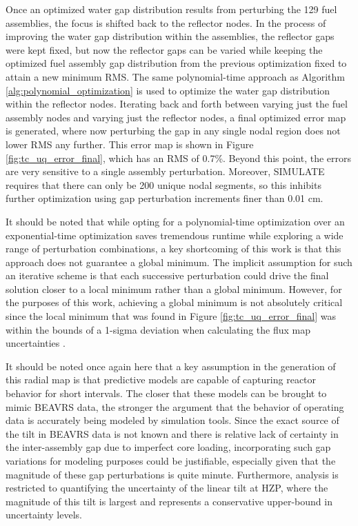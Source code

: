 \documentclass{article}
\begin{document}
Once an optimized water gap distribution results from perturbing the 129 fuel assemblies, the focus is shifted back to the reflector nodes. In the process of improving the water gap distribution within the assemblies, the reflector gaps were kept fixed, but now the reflector gaps can be varied while keeping the optimized fuel assembly gap distribution from the previous optimization fixed to attain a new minimum RMS. The same polynomial-time approach as Algorithm \ref{alg:polynomial_optimization} is used to optimize the water gap distribution within the reflector nodes. Iterating back and forth between varying just the fuel assembly nodes and varying just the reflector nodes, a final optimized error map is generated, where now perturbing the gap in any single nodal region does not lower RMS any further. This error map is shown in Figure \ref{fig:tc_uq_error_final}, which has an RMS of 0.7\%. Beyond this point, the errors are very sensitive to a single assembly perturbation. Moreover, SIMULATE requires that there can only be 200 unique nodal segments, so this inhibits further optimization using gap perturbation increments finer than 0.01 cm.



It should be noted that while opting for a polynomial-time optimization over an exponential-time optimization saves tremendous runtime while exploring a wide range of perturbation combinations, a key shortcoming of this work is that this approach does not guarantee a global minimum. The implicit assumption for such an iterative scheme is that each successive perturbation could drive the final solution closer to a local minimum rather than a global minimum. However, for the purposes of this work, achieving a global minimum is not absolutely critical since the local minimum that was found in Figure \ref{fig:tc_uq_error_final} was within the bounds of a 1-sigma deviation when calculating the flux map uncertainties \cite{liang_year2_report}.

It should be noted once again here that a key assumption in the generation of this radial map is that predictive models are capable of capturing reactor behavior for short intervals. The closer that these models can be brought to mimic BEAVRS data, the stronger the argument that the behavior of operating data is accurately being modeled by simulation tools. Since the exact source of the tilt in BEAVRS data is not known and there is relative lack of certainty in the inter-assembly gap due to imperfect core loading, incorporating such gap variations for modeling purposes could be justifiable, especially given that the magnitude of these gap perturbations is quite minute. Furthermore, analysis is restricted to quantifying the uncertainty of the linear tilt at HZP, where the magnitude of this tilt is largest and represents a conservative upper-bound in uncertainty levels.
\end{document}
